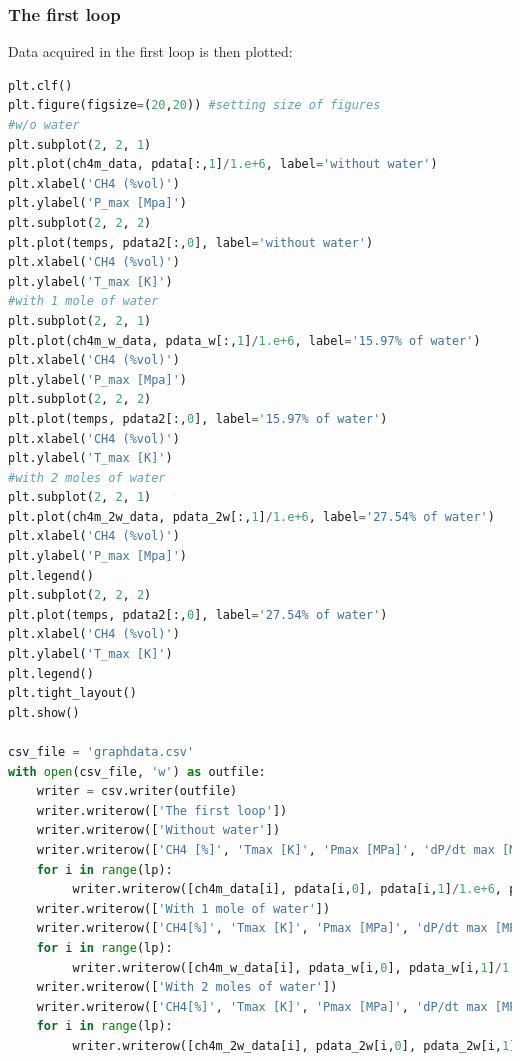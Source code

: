 \documentclass[a4paper]{article}
\begin{document}
\subsubsection{The first loop}
Data acquired in the first loop is then plotted:
\begin{lstlisting}[language=python]
plt.clf()
plt.figure(figsize=(20,20)) #setting size of figures
#w/o water
plt.subplot(2, 2, 1)
plt.plot(ch4m_data, pdata[:,1]/1.e+6, label='without water')
plt.xlabel('CH4 (%vol)')
plt.ylabel('P_max [Mpa]')
plt.subplot(2, 2, 2)
plt.plot(temps, pdata2[:,0], label='without water')
plt.xlabel('CH4 (%vol)')
plt.ylabel('T_max [K]')
#with 1 mole of water
plt.subplot(2, 2, 1)
plt.plot(ch4m_w_data, pdata_w[:,1]/1.e+6, label='15.97% of water')
plt.xlabel('CH4 (%vol)')
plt.ylabel('P_max [Mpa]')
plt.subplot(2, 2, 2)
plt.plot(temps, pdata2[:,0], label='15.97% of water')
plt.xlabel('CH4 (%vol)')
plt.ylabel('T_max [K]')
#with 2 moles of water
plt.subplot(2, 2, 1)
plt.plot(ch4m_2w_data, pdata_2w[:,1]/1.e+6, label='27.54% of water')
plt.xlabel('CH4 (%vol)')
plt.ylabel('P_max [Mpa]')
plt.legend()
plt.subplot(2, 2, 2)
plt.plot(temps, pdata2[:,0], label='27.54% of water')
plt.xlabel('CH4 (%vol)')
plt.ylabel('T_max [K]')
plt.legend()
plt.tight_layout()
plt.show()

csv_file = 'graphdata.csv'
with open(csv_file, 'w') as outfile:
    writer = csv.writer(outfile)
    writer.writerow(['The first loop'])
    writer.writerow(['Without water'])
    writer.writerow(['CH4 [%]', 'Tmax [K]', 'Pmax [MPa]', 'dP/dt max [MPa/s]'])
    for i in range(lp):
         writer.writerow([ch4m_data[i], pdata[i,0], pdata[i,1]/1.e+6, pdata[i,2]])
    writer.writerow(['With 1 mole of water'])
    writer.writerow(['CH4[%]', 'Tmax [K]', 'Pmax [MPa]', 'dP/dt max [MPa/s]'])
    for i in range(lp):
         writer.writerow([ch4m_w_data[i], pdata_w[i,0], pdata_w[i,1]/1.e+6, pdata_w[i,2]])
    writer.writerow(['With 2 moles of water'])
    writer.writerow(['CH4[%]', 'Tmax [K]', 'Pmax [MPa]', 'dP/dt max [MPa/s]'])
    for i in range(lp):
         writer.writerow([ch4m_2w_data[i], pdata_2w[i,0], pdata_2w[i,1]/1.e+6, pdata_2w[i,2]])
\end{lstlisting}
\end{document}
